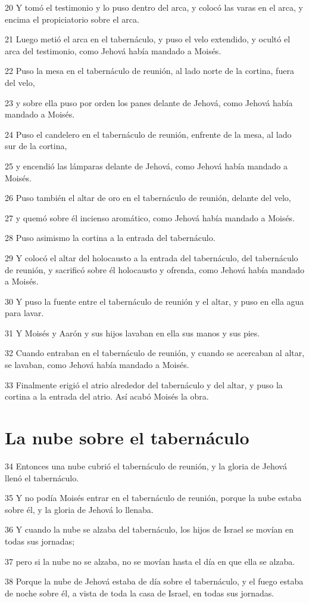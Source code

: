 \par 20 Y tomó el testimonio y lo puso dentro del arca, y colocó las varas en el arca, y encima el propiciatorio sobre el arca.
\par 21 Luego metió el arca en el tabernáculo, y puso el velo extendido, y ocultó el arca del testimonio, como Jehová había mandado a Moisés.
\par 22 Puso la mesa en el tabernáculo de reunión, al lado norte de la cortina, fuera del velo,
\par 23 y sobre ella puso por orden los panes delante de Jehová, como Jehová había mandado a Moisés.
\par 24 Puso el candelero en el tabernáculo de reunión, enfrente de la mesa, al lado sur de la cortina,
\par 25 y encendió las lámparas delante de Jehová, como Jehová había mandado a Moisés.
\par 26 Puso también el altar de oro en el tabernáculo de reunión, delante del velo,
\par 27 y quemó sobre él incienso aromático, como Jehová había mandado a Moisés.
\par 28 Puso asimismo la cortina a la entrada del tabernáculo.
\par 29 Y colocó el altar del holocausto a la entrada del tabernáculo, del tabernáculo de reunión, y sacrificó sobre él holocausto y ofrenda, como Jehová había mandado a Moisés.
\par 30 Y puso la fuente entre el tabernáculo de reunión y el altar, y puso en ella agua para lavar.
\par 31 Y Moisés y Aarón y sus hijos lavaban en ella sus manos y sus pies.
\par 32 Cuando entraban en el tabernáculo de reunión, y cuando se acercaban al altar, se lavaban, como Jehová había mandado a Moisés.
\par 33 Finalmente erigió el atrio alrededor del tabernáculo y del altar, y puso la cortina a la entrada del atrio. Así acabó Moisés la obra.

\section*{La nube sobre el tabernáculo}

\par 34 Entonces una nube cubrió el tabernáculo de reunión, y la gloria de Jehová llenó el tabernáculo.
\par 35 Y no podía Moisés entrar en el tabernáculo de reunión, porque la nube estaba sobre él, y la gloria de Jehová lo llenaba.
\par 36 Y cuando la nube se alzaba del tabernáculo, los hijos de Israel se movían en todas sus jornadas;
\par 37 pero si la nube no se alzaba, no se movían hasta el día en que ella se alzaba.
\par 38 Porque la nube de Jehová estaba de día sobre el tabernáculo, y el fuego estaba de noche sobre él, a vista de toda la casa de Israel, en todas sus jornadas.


